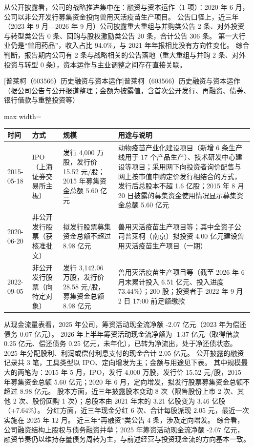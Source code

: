  从公开披露看，公司的战略推进集中在：融资与资本运作（1 项）：2020 年 6 月，公司以非公开发行募集资金投向兽用灭活疫苗生产项目。 公告口径上，近三年（2023 年 9 月---2026 年 9 月）公司披露重大重组与并购类公告 2 条、对外投资与转型类公告 0 条、回购与股权激励类公告 20 条，合计公告 306 条。 第一大行业仍是“兽用药品”，收入占比 94.0\%，与 2021 年年报相比没有方向性变化。 综合判断，报告期内公司有 2 条与战略相关的公告落地（重大重组与并购 2 条、对外投资与转型 0 条），资本运作与主业调整之间存在直接关联。

\begin{center}\small\setlength{\tabcolsep}{4pt}
[普莱柯（603566）历史融资与资本运作]{普莱柯（603566）历史融资与资本运作（据公司公告与公开报道整理；金额为披露值，含首次公开发行、再融资、债券、银行借款与重整投资等）}
\begin{adjustbox}{max width=\textwidth}
\begin{tabular}{@{}p{1.45cm}p{2.55cm}p{4.05cm}p{4.95cm}@{}}
\toprule
时间 & 方式 & 规模 & 用途与说明 \\
\midrule
2015-05-18 & IPO（上海证券交易所主板） & 发行 4,\allowbreak{}000 万股，\allowbreak{}发行价 15.52 元/\allowbreak{}股；2015 年募集资金总额 5.60 亿元 & 动物疫苗产业化建设项目（新增 6 条生产线用于 17 个产品生产）、\allowbreak{}技术研发中心建设等项目；采用网下向投资者询价配售与网上按市值申购定价发行相结合的方式，\allowbreak{}发行后总股本不超 1.6 亿股；2015 年 8 月 20 日披露的募集资金使用情况显示募集资金总额 5.60 亿元 \\
2020-06-20 & 非公开发行股票（获核准批文） & 拟发行股票募集资金总额不超过 8.98 亿元 & 兽用灭活疫苗生产项目等；其中全资子公司普莱柯（南京）拟投资 4.00 亿元建设兽用灭活疫苗生产项目（一期） \\
2022-09-05 & 非公开发行股票（向特定对象） & 发行 3,\allowbreak{}142.06 万股，\allowbreak{}发行价 28.58 元/\allowbreak{}股，\allowbreak{}募集资金总额 8.98 亿元 & 兽用灭活疫苗生产项目等（截至 2026 年 6 月末累计投入 6.51 亿元、\allowbreak{}投入进度 73.44\%）；200 股；投资者于 2022 年 9 月 2 日 17:00 前足额缴款 \\
\bottomrule
\end{tabular}
\end{adjustbox}
\end{center}

 从现金流量表看，2025 年公司，筹资活动现金流净额 -2.07 亿元（2023 年为偿还债务 0.07 亿元）。 2026 年上半年筹资活动现金流净额为 -1.37 亿元（取得借款 0.25 亿元、偿还债务 0.25 亿元，未年化），已转为净流出，处于净还债状态。 2025 年分配股利、利润或偿付利息支付的现金合计 2.05 亿元。 公开披露的融资记录共 3 笔，工具类型以 IPO、定向增发为主；金额与用途见下表。 其中规模最大的两笔为：2015 年 5 月，IPO，发行 4,000 万股，发行价 15.52 元/股，2015 年募集资金总额 5.60 亿元；2020 年 6 月，定向增发，拟发行股票募集资金总额不超过 8.98 亿元。 股本方面，近三年披露股本变动 8 次（限售股份上市 2 次、其他 2 次、股份回购 1 次）；总股本由 2021 年末的 3.21 亿股变为 3.46 亿股（+7.64\%）。 分红方面，近三年现金分红 6 次、合计每股派现 2.05 元，最近一次实施在 2025 年 12 月。 近三年“再融资”类公告 4 条，涉及定向增发。 综合看，公司融资结构上股权与债务融资并举；2025 年筹资活动现金流净额 -2.07 亿元，融资节奏仍以维持存量债务周转为主，与前述经营与投资现金流的方向基本一致。

